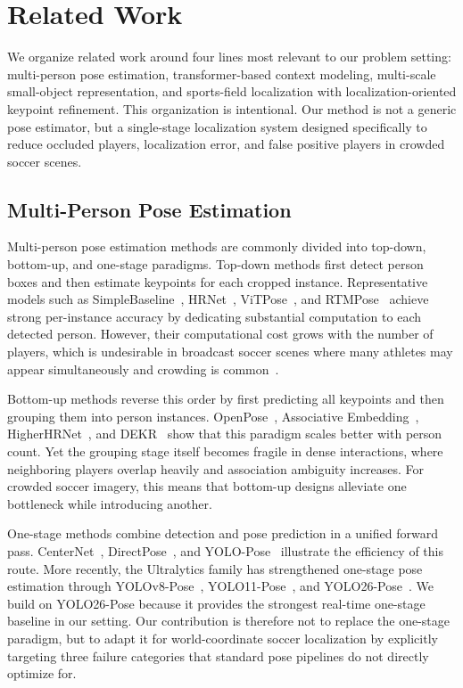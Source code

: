 \section{Related Work}
\label{sec:related}

We organize related work around four lines most relevant to our problem setting: multi-person pose estimation, transformer-based context modeling, multi-scale small-object representation, and sports-field localization with localization-oriented keypoint refinement. This organization is intentional. Our method is not a generic pose estimator, but a single-stage localization system designed specifically to reduce occluded players, localization error, and false positive players in crowded soccer scenes.

\subsection{Multi-Person Pose Estimation}
\label{subsec:pose}

Multi-person pose estimation methods are commonly divided into top-down, bottom-up, and one-stage paradigms. Top-down methods first detect person boxes and then estimate keypoints for each cropped instance. Representative models such as SimpleBaseline~\cite{xiao2018simple}, HRNet~\cite{sun2019deep}, ViTPose~\cite{xu2022vitpose}, and RTMPose~\cite{jiang2023rtmpose} achieve strong per-instance accuracy by dedicating substantial computation to each detected person. However, their computational cost grows with the number of players, which is undesirable in broadcast soccer scenes where many athletes may appear simultaneously and crowding is common~\cite{fang2017rmpe}.

Bottom-up methods reverse this order by first predicting all keypoints and then grouping them into person instances. OpenPose~\cite{cao2017realtime}, Associative Embedding~\cite{newell2017associative}, HigherHRNet~\cite{cheng2020higherhrnet}, and DEKR~\cite{geng2021bottom} show that this paradigm scales better with person count. Yet the grouping stage itself becomes fragile in dense interactions, where neighboring players overlap heavily and association ambiguity increases. For crowded soccer imagery, this means that bottom-up designs alleviate one bottleneck while introducing another.

One-stage methods combine detection and pose prediction in a unified forward pass. CenterNet~\cite{zhou2019objects}, DirectPose~\cite{tian2019directpose}, and YOLO-Pose~\cite{maji2022yolo} illustrate the efficiency of this route. More recently, the Ultralytics family has strengthened one-stage pose estimation through YOLOv8-Pose~\cite{jocher2023yolov8}, YOLO11-Pose~\cite{jocher2024yolo11}, and YOLO26-Pose~\cite{ultralytics2025yolo26}. We build on YOLO26-Pose because it provides the strongest real-time one-stage baseline in our setting. Our contribution is therefore not to replace the one-stage paradigm, but to adapt it for world-coordinate soccer localization by explicitly targeting three failure categories that standard pose pipelines do not directly optimize for.

